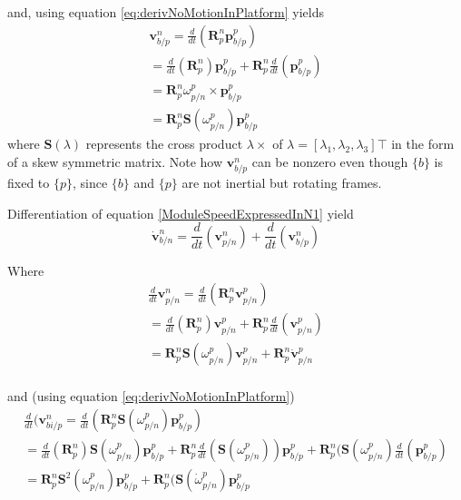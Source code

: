 and, using equation \ref{eq:derivNoMotionInPlatform} yields
\begin{equation}
\begin{split}
\textbf{v}_{b/p}^{n}  = \frac{d}{dt}( \textbf{R}_{p}^{n}\textbf{p}_{b/p}^{p})  \\
= \frac{d}{dt}(\textbf{R}_{p}^{n}) \textbf{p}_{b/p}^{p} + \textbf{R}_{p}^{n} \frac{d}{dt}(\textbf{p}_{b/p}^{p}) \\
= \textbf{R}_{p}^{n} \omega_{p/n}^{p} \times \textbf{p}_{b/p}^{p} \\
= \textbf{R}_{p}^{n} \textbf{S}(\omega_{p/n}^{p}) \textbf{p}_{b/p}^{p}
\end{split}
\end{equation}
where $\textbf{S}(\lambda)$ represents the cross product $\lambda \times$ of $\lambda = [\lambda_1,\lambda_2,\lambda_3]\top$ in the form of a skew symmetric matrix. Note how $\textbf{v}_{b/p}^{n}$ can be nonzero even though $\{b\}$ is fixed to $\{p\}$, since $\{b\}$ and $\{p\}$ are not inertial but rotating frames.

Differentiation of equation \ref{ModuleSpeedExpressedInN1} yield
\begin{equation}
\dot{\textbf{v}}_{b/n}^{n} = \frac{d}{dt}(\textbf{v}_{p/n}^{n}) + \frac{d}{dt}(\textbf{v}_{b/p}^{n})
\label{EarlyAccelleration0}
\end{equation}

Where
\begin{equation}
\begin{split}
\frac{d}{dt}\textbf{v}_{p/n}^{n} = \frac{d}{dt}(\textbf{R}_{p}^{n} \textbf{v}_{p/n}^{p}) \\
= \frac{d}{dt}(\textbf{R}_{p}^{n}) \textbf{v}_{p/n}^{p} + \textbf{R}_{p}^{n} \frac{d}{dt}(\textbf{v}_{p/n}^{p})\\
= \textbf{R}_{p}^{n}\textbf{S}(\omega_{p/n}^{p}) \textbf{v}_{p/n}^{p} + \textbf{R}_{p}^{n} \dot{\textbf{v}}_{p/n}^{p}\\
\end{split}
\label{EarlyAccelleration1}
\end{equation}

and (using equation \ref{eq:derivNoMotionInPlatform})
\begin{equation}
\begin{split}
\frac{d}{dt}(\textbf{v}_{bi/p}^{n} = \frac{d}{dt}( \textbf{R}_{p}^{n} \textbf{S}(\omega_{p/n}^{p}) \textbf{p}_{b/p}^{p})\\
= \frac{d}{dt}(\textbf{R}_{p}^{n}) \textbf{S}(\omega_{p/n}^{p}) \textbf{p}_{b/p}^{p} + \textbf{R}_{p}^{n}\frac{d}{dt}(\textbf{S}(\omega_{p/n}^{p}))\textbf{p}_{b/p}^{p} + \textbf{R}_{p}^{n}(\textbf{S}(\omega_{p/n}^{p})\frac{d}{dt}(\textbf{p}_{b/p}^{p})\\
= \textbf{R}_{p}^{n} \textbf{S}^{2}(\omega_{p/n}^{p}) \textbf{p}_{b/p}^{p} + \textbf{R}_{p}^{n}(\textbf{S}(\dot{\omega}_{p/n}^{p})\textbf{p}_{b/p}^{p} 
\end{split}
\label{EarlyAccelleration2}
\end{equation}

